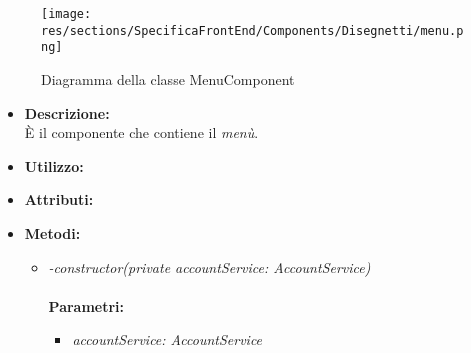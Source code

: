 \begin{figure}[h!]
	\centering
	\texttt{[image: res/sections/SpecificaFrontEnd/Components/Disegnetti/menu.png]}
	\caption{Diagramma della classe MenuComponent}
\end{figure}

\begin{itemize}
	\item \textbf{Descrizione:}\\
	È il componente che contiene il \textit{menù}.
	\item \textbf{Utilizzo:}\\
	
	\item \textbf{Attributi:}
		
	\item \textbf{Metodi:}
		\begin{itemize}
			\item \emph{-constructor(private accountService: AccountService)}\\
    		\\
    		\textbf{Parametri:}
    		\begin{itemize}
    		
    			\item \emph{accountService: AccountService}\\
    			
    		\end{itemize}
		\end{itemize}
\end{itemize}